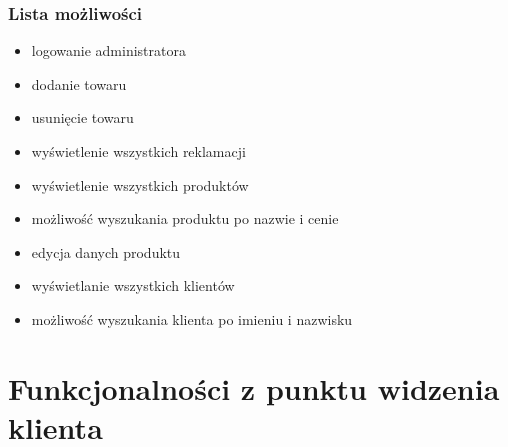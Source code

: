 \documentclass[10pt]{report}
\begin{document}
		
			\subsection{Lista możliwości}
				\begin{itemize}
					\item logowanie administratora
					\item dodanie towaru
					\item usunięcie towaru
					\item wyświetlenie wszystkich reklamacji
					\item wyświetlenie wszystkich produktów
					\item możliwość wyszukania produktu po nazwie i cenie
					\item edycja danych produktu
					\item wyświetlanie wszystkich klientów
					\item możliwość wyszukania klienta po imieniu i nazwisku
				\end{itemize}


	
	\chapter{Funkcjonalności z punktu widzenia klienta}
	
	
\end{document}
